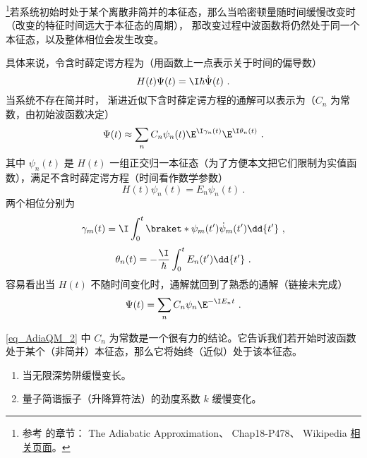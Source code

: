 
\begin{issues}
\issueTODO
\end{issues}

\footnote{参考 \cite{GriffE} 的章节： The Adiabatic Approximation、 \cite{Shankar} Chap18-P478、 Wikipedia \href{https://en.wikipedia.org/wiki/Adiabatic_theorem}{相关页面}。}若系统初始时处于某个离散非简并的本征态，那么当哈密顿量随时间缓慢改变时（改变的特征时间远大于本征态的周期）， 那改变过程中波函数将仍然处于同一个本征态，以及整体相位会发生改变。

具体来说，令含时薛定谔方程为（用函数上一点表示关于时间的偏导数）
\begin{equation}
H(t)\Psi(t) = \I\hbar\dot\Psi(t)~.
\end{equation}
当系统不存在简并时， 渐进近似下含时薛定谔方程的通解可以表示为（$C_n$ 为常数，由初始波函数决定）
\begin{equation}\label{eq_AdiaQM_2}
\Psi(t) \approx \sum_n C_n \psi_n(t) \E^{\I\gamma_n(t)}\E^{\I\theta_n(t)}~.
\end{equation}
其中 $\psi_n(t)$ 是 $H(t)$ 一组正交归一本征态（为了方便本文把它们限制为实值函数），满足不含时薛定谔方程（时间看作数学参数）
\begin{equation}
H(t)\psi_n(t) = E_n\psi_n(t)~.
\end{equation}
两个相位分别为
\begin{equation}
\gamma_m(t) = \I \int_0^t \braket*{\psi_m(t')}{\dot\psi_m(t')}\dd{t'}~,
\end{equation}
\begin{equation}
\theta_n(t) = -\frac{\I}{\hbar} \int_0^t E_n(t')\dd{t'}~.
\end{equation}
容易看出当 $H(t)$ 不随时间变化时，通解就回到了熟悉的通解（链接未完成）
\begin{equation}
\Psi(t) = \sum_n C_n \psi_n \E^{-\I E_n t}~.
\end{equation}

\autoref{eq_AdiaQM_2} 中 $C_n$ 为常数是一个很有力的结论。它告诉我们若开始时波函数处于某个（非简并）本征态，那么它将始终（近似）处于该本征态。

\begin{example}{}
\begin{enumerate}
\item 当无限深势阱缓慢变长。
\item 量子简谐振子（升降算符法）的劲度系数 $k$ 缓慢变化。
\end{enumerate}
\end{example}

